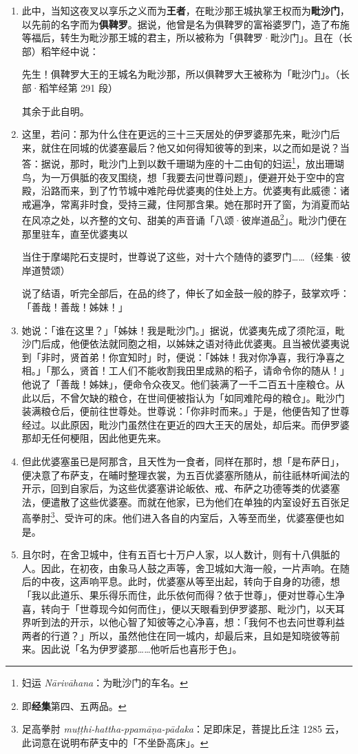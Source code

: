 \begin{enumerate}\item 此中，当知这夜叉以享乐之义而为\textbf{王者}，在毗沙那王城执掌王权而为\textbf{毗沙门}，以先前的名字而为\textbf{俱鞞罗}。据说，他曾是名为俱鞞罗的富裕婆罗门，造了布施等福后，转生为毗沙那王城的君主，所以被称为「俱鞞罗·毗沙门」。且在（长部）稻竿经中说：\begin{quoting}先生！俱鞞罗大王的王城名为毗沙那，所以俱鞞罗大王被称为「毗沙门」。（长部·稻竿经第 291 段）\end{quoting}其余于此自明。
\item 这里，若问：那为什么住在更远的三十三天居处的伊罗婆那先来，毗沙门后来，就住在同城的优婆塞最后？他又如何得知彼等的到来，以之而如是说？当答：据说，那时，毗沙门上到以数千珊瑚为座的十二由旬的妇运\footnote{妇运 \textit{Nārivāhana}：为毗沙门的车名。}，放出珊瑚鸟，为一万俱胝的夜叉围绕，想「我要去问世尊问题」，便避开处于空中的宫殿，沿路而来，到了竹节城中难陀母优婆夷的住处上方。优婆夷有此威德：诸戒遍净，常离非时食，受持三藏，住阿那含果。她在那时开了窗，为消夏而站在风凉之处，以齐整的文句、甜美的声音诵「八颂·彼岸道品\footnote{即\textbf{经集}第四、五两品。}」。毗沙门便在那里驻车，直至优婆夷以\begin{quoting}当住于摩竭陀石支提时，世尊说了这些，对十六个随侍的婆罗门……（经集·彼岸道赞颂）\end{quoting}说了结语，听完全部后，在品的终了，伸长了如金鼓一般的脖子，鼓掌欢呼：「善哉！善哉！姊妹！」
\item 她说：「谁在这里？」「姊妹！我是毗沙门。」据说，优婆夷先成了须陀洹，毗沙门后成，他便依法就同胞之相，以姊妹之语对待此优婆夷。且当被优婆夷说到「非时，贤首弟！你宜知时」时，便说：「姊妹！我对你净喜，我行净喜之相。」「那么，贤首！工人们不能收割我田里成熟的稻子，请命令你的随从！」他说了「善哉！姊妹」，便命令众夜叉。他们装满了一千二百五十座粮仓。从此以后，不曾欠缺的粮仓，在世间便被指认为「如同难陀母的粮仓」。毗沙门装满粮仓后，便前往世尊处。世尊说：「你非时而来。」于是，他便告知了世尊经过。以此原因，毗沙门虽然住在更近的四大王天的居处，却后来。而伊罗婆那却无任何梗阻，因此他更先来。
\item 但此优婆塞虽已是阿那含，且天性为一食者，同样在那时，想「是布萨日」，便决意了布萨支，在晡时整理衣裳，为五百优婆塞所随从，前往祇林听闻法的开示，回到自家后，为这些优婆塞讲论皈依、戒、布萨之功德等类的优婆塞法，便遣散了这些优婆塞。而就在他家，已为他们在单独的内室设好五百张足高拳肘\footnote{足高拳肘 \textit{muṭṭhi-hattha-ppamāṇa-pādaka}：足即床足，菩提比丘注 1285 云，此词意在说明布萨支中的「不坐卧高床」。}、受许可的床。他们进入各自的内室后，入等至而坐，优婆塞便也如是。
\item 且尔时，在舍卫城中，住有五百七十万户人家，以人数计，则有十八俱胝的人。因此，在初夜，由象马人鼓之声等，舍卫城如大海一般，一片声响。在随后的中夜，这声响平息。此时，优婆塞从等至出起，转向于自身的功德，想「我以此道乐、果乐得乐而住，此乐依何而得？依于世尊」，便对世尊心生净喜，转向于「世尊现今如何而住」，便以天眼看到伊罗婆那、毗沙门，以天耳界听到法的开示，以他心智了知彼等之心净喜，想：「我何不也去问世尊利益两者的行道？」所以，虽然他住在同一城内，却最后来，且如是知晓彼等前来。因此说「名为伊罗婆那……他听后也喜形于色」。\end{enumerate}

